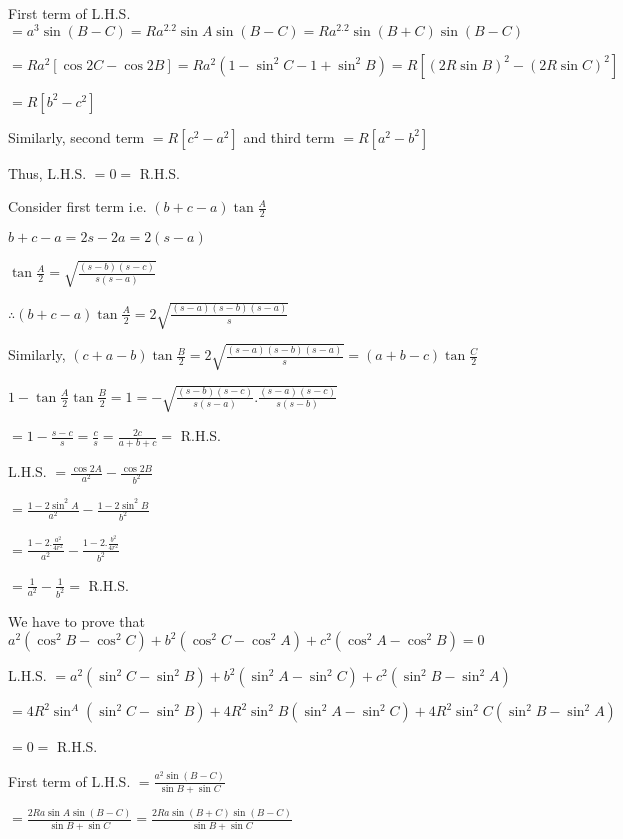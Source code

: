 \item First term of L.H.S. $= a^3\sin(B - C) = Ra^2.2\sin A\sin(B - C) = Ra^2.2\sin(B + C)\sin(B - C)$

  $= Ra^2[\cos 2C - \cos 2B] = Ra^2(1 - \sin^2C - 1 + \sin^2B) = R[(2R\sin B)^2 - (2R\sin C)^2]$

  $= R[b^2 - c^2]$

  Similarly, second term $= R[c^2 - a^2]$ and third term $= R[a^2 - b^2]$

  Thus, L.H.S. $= 0 =$ R.H.S.

\item Consider first term i.e. $(b + c - a)\tan \frac{A}{2}$

  $b + c - a = 2s - 2a = 2(s - a)$

  $\tan\frac{A}{2} = \sqrt{\frac{(s - b)(s - c)}{s(s - a)}}$

  $\therefore (b + c - a)\tan \frac{A}{2} = 2\sqrt{\frac{(s - a)(s - b)(s - a)}{s}}$

  Similarly, $(c + a - b)\tan \frac{B}{2} = 2\sqrt{\frac{(s - a)(s - b)(s - a)}{s}} = (a + b - c)\tan\frac{C}{2}$

\item $1 - \tan\frac{A}{2}\tan\frac{B}{2} = 1 =- \sqrt{\frac{(s - b)(s - c)}{s(s - a)}.\frac{(s - a)(s - c)}{s(s - b)}}$

  $= 1 - \frac{s - c}{s} = \frac{c}{s} = \frac{2c}{a + b + c} =$ R.H.S.

\item L.H.S. $= \frac{\cos2A}{a^2} - \frac{\cos2B}{b^2}$

  $= \frac{1 - 2\sin^2A}{a^2} - \frac{1 - 2\sin^2B}{b^2}$

  $= \frac{1 - 2.\frac{a^2}{4r^2}}{a^2} - \frac{1 - 2.\frac{b^2}{4r^2}}{b^2}$

  $= \frac{1}{a^2} - \frac{1}{b^2} =$ R.H.S.

\item We have to prove that $a^2(\cos^2B - \cos^2C) + b^2(\cos^2C - \cos^2A) + c^2(\cos^2A - \cos^2B) = 0$

  L.H.S. $= a^2(\sin^2C - \sin^2B) + b^2(\sin^2A - \sin^2C) + c^2(\sin^2B - \sin^2A)$

  $= 4R^2\sin^A(\sin^2C - \sin^2B) + 4R^2\sin^2B(\sin^2A - \sin^2C) + 4R^2\sin^2C(\sin^2B - \sin^2A)$

  $= 0 =$ R.H.S.

\item First term of L.H.S. $= \frac{a^2\sin(B - C)}{\sin B + \sin C}$

  $= \frac{2Ra\sin A\sin(B - C)}{\sin B + \sin C} = \frac{2Ra\sin(B + C)\sin(B - C)}{\sin B + \sin C}$

